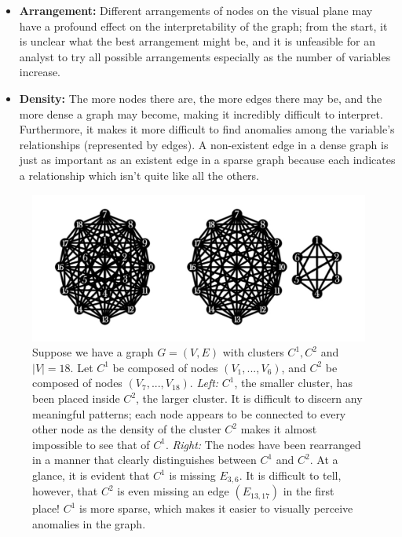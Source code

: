 \tablespacing
\begin{itemize}
	\item \textbf{Arrangement:} Different arrangements of nodes on the visual 
	plane may have a profound effect on the interpretability of the graph; from 
	the start, it is unclear what the best arrangement might be, and it is 
	unfeasible for an analyst to try all possible arrangements 
	especially as the number of variables increase.
	
	\item \textbf{Density:} The more nodes there are, the more edges there may 
	be, and the more dense a graph may become, making it incredibly difficult 
	to interpret. Furthermore, it makes it more difficult to find anomalies 
	among the variable's relationships (represented by edges). A non-existent 
	edge in a dense graph is just as important as an existent edge in a sparse 
	graph because each indicates a relationship which isn't quite like all the 
	others.
\end{itemize}
\bodyspacing

\begin{figure}[htb]
	\begin{center}
		\includegraphics[width=1\linewidth]{ch-gc/figures/arr_density}
		\caption[Difficulties with graph visualization.]{
		Suppose we have a graph $G=(V,E)$ with clusters $C^1,C^2$ and $|V|=18$. 
		Let $C^1$ be composed of nodes $(V_1,...,V_6)$, and $C^2$ be composed 
		of nodes $(V_7,...,V_{18})$. 
		\textit{Left:} $C^1$, the smaller cluster, has been placed inside 
		$C^2$, the larger cluster. It is difficult to discern any meaningful 
		patterns; each node appears to be connected to every other node as the 
		density of the cluster $C^2$ makes it almost impossible to see that of 
		$C^1$.
		\textit{Right:} The nodes have been rearranged in a manner that clearly 
		distinguishes between $C^1$ and $C^2$. At a glance, it is evident that 
		$C^1$ is missing $E_{3,6}$. It is difficult to tell, however, that 
		$C^2$ is even missing an edge $(E_{13,17})$ in the first place!
		$C^1$ is more sparse, which makes it easier to visually perceive 
		anomalies in the graph.}
		\label{fig:gc:arr_density}
	\end{center}
\end{figure}

